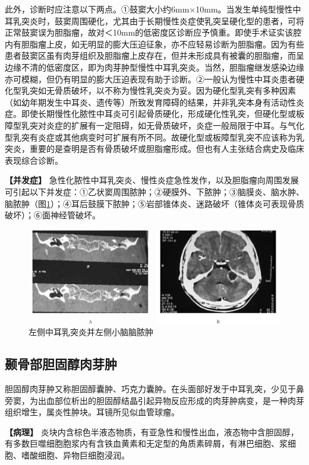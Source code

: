 此外，诊断时应注意以下两点。①鼓窦大小约6mm×10mm。当发生单纯型慢性中耳乳突炎时，鼓窦周围硬化，尤其由于长期慢性炎症使乳突呈硬化型的患者，可将正常鼓窦误为胆脂瘤，故对＜10mm的低密度区诊断应予慎重。即使手术证实该腔内有胆脂瘤上皮，如无明显的膨大压迫征象，亦不应轻易诊断为胆脂瘤。因为有些患者鼓窦区虽有肉芽组织及胆脂瘤上皮存在，但并未形成具有被囊的胆脂瘤，而呈边缘不清的低密度区，即为肉芽肿型慢性中耳乳突炎。当然，胆脂瘤继发感染边缘亦可模糊，但仍有明显的膨大压迫表现有助于诊断。②一般认为慢性中耳炎患者硬化型乳突如无骨质破坏，以不称为慢性乳突炎为妥。因为硬化型乳突有多种因素（如幼年期发生中耳炎、遗传等）所致发育障碍的结果，并非乳突本身有活动性炎症。即使长期慢性化脓性中耳炎可引起骨质硬化，形成硬化性乳突，但硬化型或板障型乳突对炎症的扩展有一定阻碍，如无骨质破坏，炎症一般局限于中耳。与气化型乳突有炎症或其他病变时可扩展有所不同。故硬化型或板障型乳突不应该称为乳突炎，重要的是查明是否有骨质破坏或胆脂瘤形成。但也有人主张结合病史及临床表现综合诊断。

\textbf{【并发症】}
急性化脓性中耳乳突炎、慢性炎症急性发作，以及胆脂瘤向周围发展可引起以下并发症：①乙状窦周围脓肿；②硬膜外、下脓肿；③脑膜炎、脑水肿、脑脓肿（图\ref{fig4-5}）；④耳后鼓膜下脓肿；⑤岩部锥体炎、迷路破坏（锥体炎可表现骨质破坏）；⑥面神经管破坏。

\begin{figure}[!htbp]
 \centering
 \includegraphics[width=.7\textwidth,height=\textheight,keepaspectratio]{./images/Image00121.jpg}
 \captionsetup{justification=centering}
 \caption{左侧中耳乳突炎并左侧小脑脑脓肿}
 \label{fig4-5}
  \end{figure} 

\subsection{颞骨部胆固醇肉芽肿}

胆固醇肉芽肿又称胆固醇囊肿、巧克力囊肿。在头面部好发于中耳乳突，少见于鼻旁窦，为出血部位析出的胆固醇结晶引起异物反应形成的肉芽肿病变，是一种肉芽组织增生，属炎性肿块。耳镜所见似血管球瘤。

\textbf{【病理】}
炎块内含棕色半液态物质，有亚急性和慢性出血，液态物中含胆固醇，有多数巨噬细胞胞浆内有含铁血黄素和无定型的角质素碎屑，有淋巴细胞、浆细胞、嗜酸细胞、异物巨细胞浸润。

